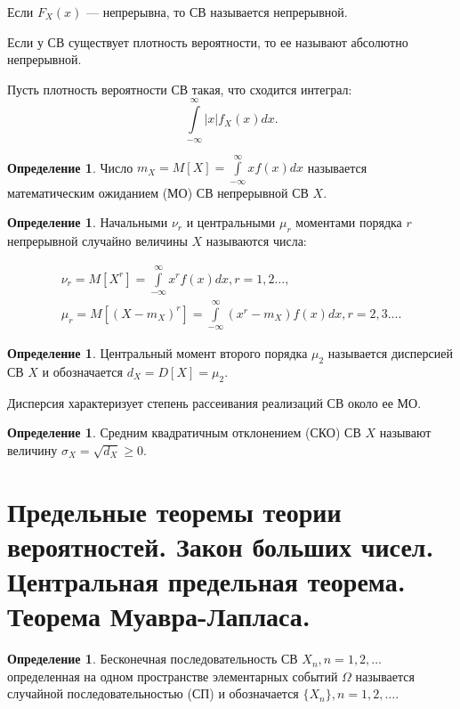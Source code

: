 \documentclass[12pt]{report}
\theoremstyle{definition}
\newtheorem{definition}[theorem]{Определение}
\begin{document}
Если $F_X(x)$ --- непрерывна, то СВ называется непрерывной.

Если у СВ существует плотность вероятности, то ее называют абсолютно непрерывной. 

Пусть плотность вероятности СВ такая, что сходится интеграл:
$$
\int\limits_{-\infty}^{\infty} |x| f_X(x) dx.
$$

\begin{definition}
Число
$
m_X = M[X] = \int\limits_{-\infty}^{\infty} x f(x) dx
$
называется математическим ожиданием (МО) СВ непрерывной СВ $X$.
\end{definition}

\begin{definition}
Начальными $\nu_r$ и центральными $\mu_r$ моментами порядка $r$ непрерывной
случайно величины $X$ называются числа:

\begin{gather*}
\nu_r = M [X^r] =  \int\limits_{-\infty}^{\infty} x^r f(x) dx, r = 1, 2 \dots, \\
\mu_r = M[ (X - m_X)^r ] = \int\limits_{-\infty}^{\infty} (x^r - m_X) f(x) dx, r = 2, 3 \dots.
\end{gather*}
\end{definition}

\begin{definition}
Центральный момент второго порядка $\mu_2$ называется дисперсией СВ $X$ и обозначается
$d_X = D[X] = \mu_2$.

Дисперсия  характеризует степень рассеивания реализаций СВ около ее МО.
\end{definition}

\begin{definition}
Средним квадратичным отклонением (СКО) СВ $X$ называют величину $\sigma_X = \sqrt{d_X} \ge 0$.
\end{definition}



\section
{
  Предельные теоремы теории вероятностей.
  Закон больших чисел. Центральная предельная теорема.
  Теорема Муавра-Лапласа.
}

\begin{definition}
Бесконечная последовательность СВ $X_n, n = 1, 2, \dots$ определенная
на одном пространстве элементарных событий $\Omega$ называется случайной
последовательностью (СП) и обозначается $\{X_n\}, n = 1, 2, \dots$.
\end{definition}
\end{document}
